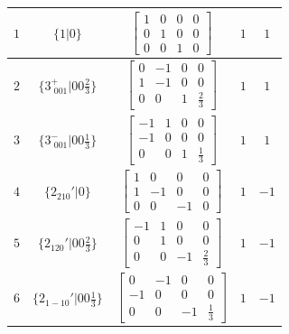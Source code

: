 \documentclass[fleqn,8pt]{jsarticle}
\begin{document}
\begin{longtable}{ccccc}
$ 1 $ & $ \{1|0\} $ & $ \begin{bmatrix} 1 & 0 & 0 & 0 \\ 0 & 1 & 0 & 0 \\ 0 & 0 & 1 & 0 \end{bmatrix} $ & $ 1 $ & $ 1 $ \\ \hline
$ 2 $ & $ \{3^{+}_{\,\,001}|0 0 \frac{2}{3}\} $ & $ \begin{bmatrix} 0 & -1 & 0 & 0 \\ 1 & -1 & 0 & 0 \\ 0 & 0 & 1 & \frac{2}{3} \end{bmatrix} $ & $ 1 $ & $ 1 $ \\ \hline
$ 3 $ & $ \{3^{-}_{\,\,001}|0 0 \frac{1}{3}\} $ & $ \begin{bmatrix} -1 & 1 & 0 & 0 \\ -1 & 0 & 0 & 0 \\ 0 & 0 & 1 & \frac{1}{3} \end{bmatrix} $ & $ 1 $ & $ 1 $ \\ \hline
$ 4 $ & $ \{2{}_{210}{}'|0\} $ & $ \begin{bmatrix} 1 & 0 & 0 & 0 \\ 1 & -1 & 0 & 0 \\ 0 & 0 & -1 & 0 \end{bmatrix} $ & $ 1 $ & $ -1 $ \\ \hline
$ 5 $ & $ \{2{}_{120}{}'|0 0 \frac{2}{3}\} $ & $ \begin{bmatrix} -1 & 1 & 0 & 0 \\ 0 & 1 & 0 & 0 \\ 0 & 0 & -1 & \frac{2}{3} \end{bmatrix} $ & $ 1 $ & $ -1 $ \\ \hline
$ 6 $ & $ \{2{}_{1-10}{}'|0 0 \frac{1}{3}\} $ & $ \begin{bmatrix} 0 & -1 & 0 & 0 \\ -1 & 0 & 0 & 0 \\ 0 & 0 & -1 & \frac{1}{3} \end{bmatrix} $ & $ 1 $ & $ -1 $ \\
\end{longtable}
\end{document}
